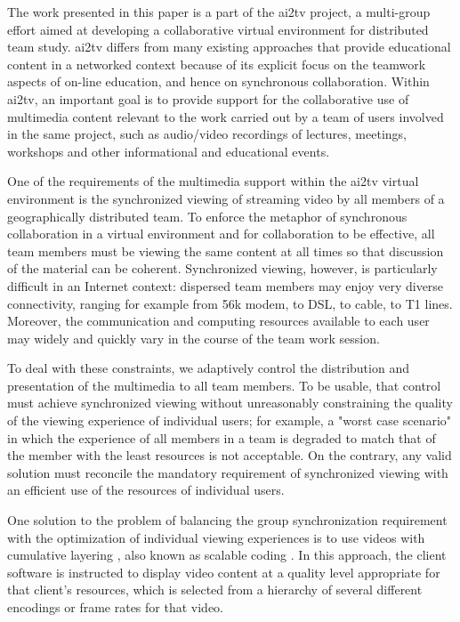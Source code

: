 \documentclass{sig-alternate}
\begin{document}
The work presented in this paper is a part of the ai2tv project, a
multi-group effort aimed at developing a collaborative virtual
environment for distributed team study.  ai2tv differs from many
existing approaches that provide educational content in a networked
context because of its explicit focus on the teamwork aspects of
on-line education, and hence on synchronous collaboration.  Within
ai2tv, an important goal is to provide support for the collaborative
use of multimedia content relevant to the work carried out by a team
of users involved in the same project, such as audio/video recordings
of lectures, meetings, workshops and other informational and
educational events.

One of the requirements of the multimedia support within the ai2tv
virtual environment is the synchronized viewing of streaming video by
all members of a geographically distributed team.  To enforce the
metaphor of synchronous collaboration in a virtual environment and for
collaboration to be effective, all team members must be viewing the
same content at all times so that discussion of the material can be
coherent.  Synchronized viewing, however, is particularly difficult in
an Internet context: dispersed team members may enjoy very diverse
connectivity, ranging for example from 56k modem, to DSL, to cable, to
T1 lines.  Moreover, the communication and computing resources
available to each user may widely and quickly vary in the course of
the team work session.

To deal with these constraints, we adaptively control the distribution
and presentation of the multimedia to all team members.  To be usable,
that control must achieve synchronized viewing without unreasonably
constraining the quality of the viewing experience of individual
users; for example, a "worst case scenario" in which the experience of
all members in a team is degraded to match that of the member with the
least resources is not acceptable. On the contrary, any valid solution
must reconcile the mandatory requirement of synchronized viewing with
an efficient use of the resources of individual users.

One solution to the problem of balancing the group synchronization
requirement with the optimization of individual viewing experiences is
to use videos with cumulative layering \cite{MCCANNE}, also known as
scalable coding \cite{LI}.  In this approach, the client software is
instructed to display video content at a quality level appropriate for
that client's resources, which is selected from a hierarchy of several
different encodings or frame rates for that video.
\end{document}
